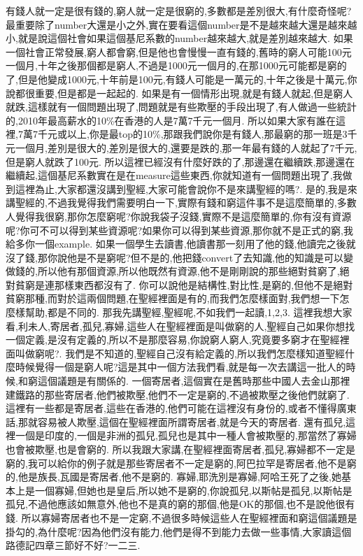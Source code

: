 \documentclass{book}
\begin{document}
有錢人就一定是很有錢的,窮人就一定是很窮的,多數都是差別很大,有什麼奇怪呢?最重要除了number大還是小之外,實在要看這個number是不是越來越大還是越來越小,就是說這個社會如果這個基尼系數的number越來越大,就是差別越來越大.
如果一個社會正常發展,窮人都會窮,但是他也會慢慢一直有錢的,舊時的窮人可能100元一個月,十年之後那個都是窮人,不過是1000元一個月的,在那1000元可能都是窮的了,但是他變成1000元,十年前是100元,有錢人可能是一萬元的,十年之後是十萬元,你說都很重要,但是都是一起起的.
如果是有一個情形出現,就是有錢人就起,但是窮人就跌,這樣就有一個問題出現了,問題就是有些欺壓的手段出現了,有人做過一些統計的,2010年最高薪水的10\%在香港的人是7萬7千元一個月.
所以如果大家有誰在這裡,7萬7千元或以上,你是最top的10\%,那跟我們說你是有錢人,那最窮的那一班是3千元一個月,差別是很大的,差別是很大的,還要是跌的,那一年最有錢的人就起了7千元,但是窮人就跌了100元.
所以這裡已經沒有什麼好跌的了,那邊還在繼續跌,那邊還在繼續起,這個基尼系數實在是在measure這些東西,你就知道有一個問題出現了,我做到這裡為止,大家都還沒講到聖經,大家可能會說你不是來講聖經的嗎?.
是的,我是來講聖經的,不過我覺得我們需要明白一下,實際有錢和窮這件事不是這麼簡單的,多數人覺得我很窮,那你怎麼窮呢?你說我袋子沒錢,實際不是這麼簡單的,你有沒有資源呢?你可不可以得到某些資源呢?如果你可以得到某些資源,那你就不是正式的窮,我給多你一個example.
如果一個學生去讀書,他讀書那一刻用了他的錢,他讀完之後就沒了錢,那你說他是不是窮呢?但不是的,他把錢convert了去知識,他的知識是可以變做錢的,所以他有那個資源,所以他既然有資源,他不是剛剛說的那些絕對貧窮了,絕對貧窮是連那樣東西都沒有了.
你可以說他是結構性,對比性,是窮的,但他不是絕對貧窮那種,而對於這兩個問題,在聖經裡面是有的,而我們怎麼樣面對,我們想一下怎麼樣幫助,都是不同的.
那我先講聖經,聖經呢,不如我們一起讀,1,2,3.
這裡我想大家看,利未人,寄居者,孤兒,寡婦,這些人在聖經裡面是叫做窮的人,聖經自己如果你想找一個定義,是沒有定義的,所以不是那麼容易,你說窮人窮人,究竟要多窮才在聖經裡面叫做窮呢?.
我們是不知道的,聖經自己沒有給定義的,所以我們怎麼樣知道聖經什麼時候覺得一個是窮人呢?這是其中一個方法我們看,就是每一次去講這一批人的時候,和窮這個議題是有關係的.
一個寄居者,這個實在是舊時那些中國人去金山那裡建鐵路的那些寄居者,他們被欺壓,他們不一定是窮的,不過被欺壓之後他們就窮了.
這裡有一些都是寄居者,這些在香港的,他們可能在這裡沒有身份的,或者不懂得廣東話,那就容易被人欺壓,這個在聖經裡面所謂寄居者,就是今天的寄居者.
還有孤兒,這裡一個是印度的,一個是非洲的孤兒,孤兒也是其中一種人會被欺壓的,那當然了寡婦也會被欺壓,也是會窮的.
所以我跟大家講,在聖經裡面寄居者,孤兒,寡婦都不一定是窮的,我可以給你的例子就是那些寄居者不一定是窮的,阿巴拉罕是寄居者,他不是窮的,他是族長,瓦國是寄居者,他不是窮的.
寡婦,耶洗別是寡婦,阿哈王死了之後,她基本上是一個寡婦,但她也是皇后,所以她不是窮的,你說孤兒,以斯帖是孤兒,以斯帖是孤兒,不過他應該如無意外,他也不是真的窮的那個,他是OK的那個,也不是說他很有錢.
所以寡婦寄居者也不是一定窮,不過很多時候這些人在聖經裡面和窮這個議題是掛勾的,為什麼呢?因為他們沒有能力,他們是得不到能力去做一些事情,大家讀這個路德記四章三節好不好?一二三.
\end{document}
